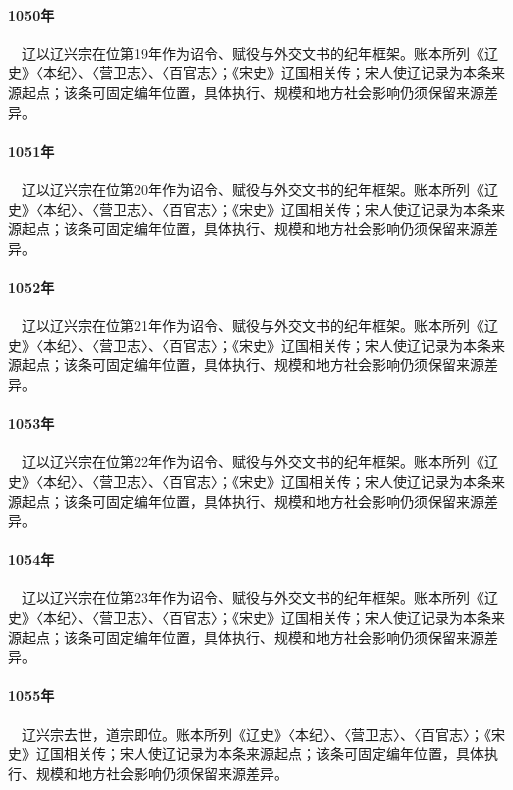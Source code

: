 \paragraph{1050年}　辽以辽兴宗在位第19年作为诏令、赋役与外交文书的纪年框架。账本所列《辽史》〈本纪〉、〈营卫志〉、〈百官志〉；《宋史》辽国相关传；宋人使辽记录为本条来源起点；该条可固定编年位置，具体执行、规模和地方社会影响仍须保留来源差异。

\paragraph{1051年}　辽以辽兴宗在位第20年作为诏令、赋役与外交文书的纪年框架。账本所列《辽史》〈本纪〉、〈营卫志〉、〈百官志〉；《宋史》辽国相关传；宋人使辽记录为本条来源起点；该条可固定编年位置，具体执行、规模和地方社会影响仍须保留来源差异。

\paragraph{1052年}　辽以辽兴宗在位第21年作为诏令、赋役与外交文书的纪年框架。账本所列《辽史》〈本纪〉、〈营卫志〉、〈百官志〉；《宋史》辽国相关传；宋人使辽记录为本条来源起点；该条可固定编年位置，具体执行、规模和地方社会影响仍须保留来源差异。

\paragraph{1053年}　辽以辽兴宗在位第22年作为诏令、赋役与外交文书的纪年框架。账本所列《辽史》〈本纪〉、〈营卫志〉、〈百官志〉；《宋史》辽国相关传；宋人使辽记录为本条来源起点；该条可固定编年位置，具体执行、规模和地方社会影响仍须保留来源差异。

\paragraph{1054年}　辽以辽兴宗在位第23年作为诏令、赋役与外交文书的纪年框架。账本所列《辽史》〈本纪〉、〈营卫志〉、〈百官志〉；《宋史》辽国相关传；宋人使辽记录为本条来源起点；该条可固定编年位置，具体执行、规模和地方社会影响仍须保留来源差异。

\paragraph{1055年}　辽兴宗去世，道宗即位。账本所列《辽史》〈本纪〉、〈营卫志〉、〈百官志〉；《宋史》辽国相关传；宋人使辽记录为本条来源起点；该条可固定编年位置，具体执行、规模和地方社会影响仍须保留来源差异。

